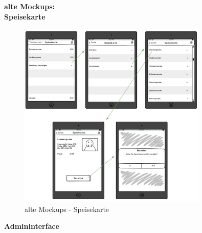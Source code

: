 \textbf{alte Mockups:}\\
\textbf{Speisekarte}\\
			\begin{figure}[H]
			\begin{centering}
			\includegraphics[width = 0.8\textwidth]{Bilder/Jok_alte_mockups}
			\par\end{centering}
			\caption{alte Mockups - Speisekarte}
			\label{alte Mockups - Speisekarte}
			\end{figure}
\pagebreak
\textbf{Admininterface}\\
